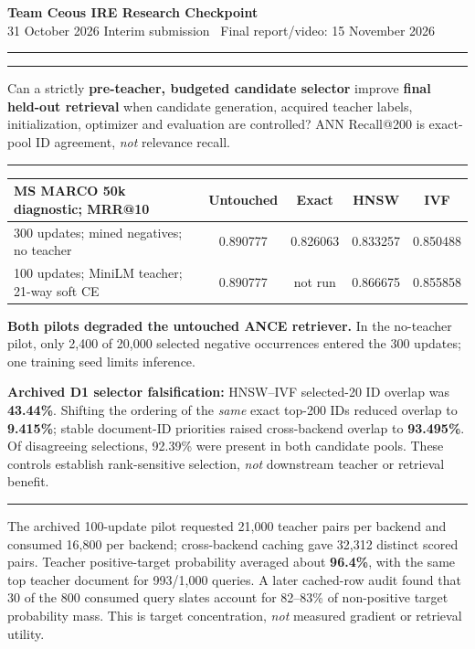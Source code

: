 \documentclass[10pt]{article}
\newcommand{\sect}[1]{\vspace{5pt}{\large\bfseries #1}\par\vspace{3pt}\hrule\vspace{6pt}}
\begin{document}
{\LARGE\bfseries Team Ceous \hfill IRE Research Checkpoint}\\[-1pt]
{\small 31 October 2026 \hfill Interim submission \textbar\ Final report/video: 15 November 2026}\vspace{5pt}\hrule

\sect{Research question}
Can a strictly \textbf{pre-teacher, budgeted candidate selector} improve \textbf{final held-out retrieval} when candidate generation, acquired teacher labels, initialization, optimizer and evaluation are controlled? ANN Recall@200 is exact-pool ID agreement, \emph{not} relevance recall.

\sect{Completed historical evidence (verified 12 October archive)}
\vspace{-3pt}
\begin{center}
\begin{tabular}{lcccc}
\hline
\textbf{MS MARCO 50k diagnostic; MRR@10} & \textbf{Untouched} & \textbf{Exact} & \textbf{HNSW} & \textbf{IVF}\\
\hline
300 updates; mined negatives; no teacher & 0.890777 & 0.826063 & 0.833257 & 0.850488\\
100 updates; MiniLM teacher; 21-way soft CE & 0.890777 & not run & 0.866675 & 0.855858\\
\hline
\end{tabular}
\end{center}
\vspace{-8pt}
\textbf{Both pilots degraded the untouched ANCE retriever.} In the no-teacher pilot, only 2,400 of 20,000 selected negative occurrences entered the 300 updates; one training seed limits inference.

\textbf{Archived D1 selector falsification:} HNSW--IVF selected-20 ID overlap was \textbf{43.44\%}. Shifting the ordering of the \emph{same} exact top-200 IDs reduced overlap to \textbf{9.415\%}; stable document-ID priorities raised cross-backend overlap to \textbf{93.495\%}. Of disagreeing selections, 92.39\% were present in both candidate pools. These controls establish rank-sensitive selection, \emph{not} downstream teacher or retrieval benefit.

\sect{Teacher utility and validity}
The archived 100-update pilot requested 21,000 teacher pairs per backend and consumed 16,800 per backend; cross-backend caching gave 32,312 distinct scored pairs. Teacher positive-target probability averaged about \textbf{96.4\%}, with the same top teacher document for 993/1,000 queries. A later cached-row audit found that 30 of the 800 consumed query slates account for 82--83\% of non-positive target probability mass. This is target concentration, \emph{not} measured gradient or retrieval utility.
\end{document}
